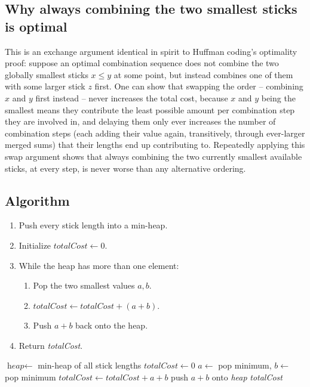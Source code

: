 \subsection*{Why always combining the two smallest sticks is optimal}

This is an exchange argument identical in spirit to Huffman coding's
optimality proof: suppose an optimal combination sequence does not combine
the two globally smallest sticks $x \le y$ at some point, but instead
combines one of them with some larger stick $z$ first. One can show that
swapping the order -- combining $x$ and $y$ first instead -- never
increases the total cost, because $x$ and $y$ being the smallest means
they contribute the least possible amount per combination step they are
involved in, and delaying them only ever increases the number of
combination steps (each adding their value again, transitively, through
ever-larger merged sums) that their lengths end up contributing to.
Repeatedly applying this swap argument shows that always combining the two
currently smallest available sticks, at every step, is never worse than
any alternative ordering.

\subsection*{Algorithm}

\begin{enumerate}
  \item Push every stick length into a min-heap.
  \item Initialize $\textit{totalCost} \gets 0$.
  \item While the heap has more than one element:
  \begin{enumerate}
    \item Pop the two smallest values $a, b$.
    \item $\textit{totalCost} \gets \textit{totalCost} + (a+b)$.
    \item Push $a+b$ back onto the heap.
  \end{enumerate}
  \item Return \textit{totalCost}.
\end{enumerate}

\begin{algorithm}[H]
\caption{Minimum Cost to Connect Sticks}
\begin{algorithmic}[1]
  \State $\textit{heap} \gets$ min-heap of all stick lengths
  \State $\textit{totalCost} \gets 0$
    \State $a \gets$ pop minimum, $b \gets$ pop minimum
    \State $\textit{totalCost} \gets \textit{totalCost} + a + b$
    \State push $a+b$ onto \textit{heap}
  \EndWhile
  \State \Return \textit{totalCost}
\EndProcedure
\end{algorithmic}
\end{algorithm}

